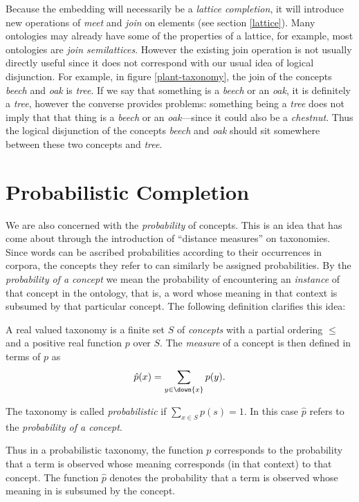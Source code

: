 Because the embedding will necessarily be a \emph{lattice completion}, it will introduce new operations of \emph{meet} and \emph{join} on elements (see section \ref{lattice}). Many ontologies may already have some of the properties of a lattice, for example, most ontologies are \emph{join semilattices}. However the existing join operation is not usually directly useful since it does not correspond with our usual idea of logical disjunction. For example, in figure \ref{plant-taxonomy}, the join of the concepts \emph{beech} and \emph{oak} is \emph{tree}. If we say that something is a \emph{beech} or an \emph{oak}, it is definitely a \emph{tree}, however the converse provides problems: something being a \emph{tree} does not imply that that thing is a \emph{beech} or an \emph{oak}---since it could also be a \emph{chestnut}. Thus the logical disjunction of the concepts \emph{beech} and \emph{oak} should sit somewhere between these two concepts and \emph{tree}.

\section{Probabilistic Completion}

We are also concerned with the \emph{probability} of concepts. This is an idea that has come about through the introduction of ``distance measures'' on taxonomies. Since words can be ascribed probabilities according to their occurrences in corpora, the concepts they refer to can similarly be assigned probabilities. By the \emph{probability of a concept} we mean the probability of encountering an \emph{instance} of that concept in the ontology, that is, a word whose meaning in that context is subsumed by that particular concept. The following definition clarifies this idea:
\begin{defn}
A real valued taxonomy is a finite set $S$ of \emph{concepts} with a partial ordering $\le$ and a positive real function $p$ over $S$. The \emph{measure} of a concept is then defined in terms of $p$ as
$$\hat{p}(x) = \sum_{y \in \down{x}} p(y).$$

The taxonomy is called \emph{probabilistic} if $\sum_{x \in S} p(s) = 1$. In this case $\hat{p}$ refers to the \emph{probability of a concept}.
\end{defn}
Thus in a probabilistic taxonomy, the function $p$ corresponds to the probability that a term is observed whose meaning corresponds (in that context) to that concept. The function $\hat{p}$ denotes the probability that a term is observed whose meaning in is subsumed by the concept.

